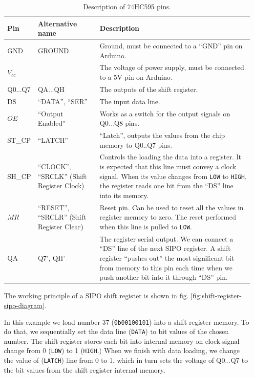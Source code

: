 \documentclass[../sparc.tex]{subfiles}
\begin{document}
\begin{table}[H]
  \centering
  \begin{tabular}{ | m{1.5cm} | m{2.5cm} | m{6.0cm} | }
    \hline
    \textbf{Pin}
    & \textbf{Alternative name}
    & \textbf{Description} \\
    \hline
    GND
    & GROUND
    & Ground, must be connected to a ``GND'' pin on Arduino. \\
    \hline
    $V_{cc}$
    &
    & The voltage of power supply, must be connected to a 5V pin
    on Arduino. \\
    \hline
    Q0...Q7
    & QA...QH
    & The outputs of the shift register. \\
    \hline
    DS
    & ``DATA'', ``SER''
    & The input data line. \\
    \hline
    $\overline{OE}$
    & ``Output Enabled''
    & Works as a switch for the output signals on
    Q0...Q8 pins. \\
    \hline
    ST\_CP
    & ``LATCH''
    & ``Latch'', outputs the values from the chip memory
    to Q0..Q7 pins. \\
    \hline
    SH\_CP
    & ``CLOCK'', ``SRCLK'' (Shift Register Clock)
    & Controls the loading the data into a register.  It is expected that
    this line must convey a clock signal.  When its value changes from
    \texttt{LOW} to \texttt{HIGH}, the register reads one bit from the ``DS''
    line into its memory. \\
    \hline
    $\overline{MR}$
    & ``RESET'', ``SRCLR'' (Shift Register Clear)
    & Reset pin.  Can be used to reset all the values in register memory
    to zero.  The reset performed when this line is pulled to \texttt{LOW}. \\
    \hline
    QA
    & Q7', QH'
    & The register serial output.  We can connect a ``DS'' line of the next
    SIPO register.  A shift register ``pushes out'' the most significant bit
    from memory to this pin each time when we push another bit into it through
    ``DS'' pin. \\
    \hline
  \end{tabular}
  \caption{Description of 74HC595 pins.}
  \label{table:shift-register-sipo-pins}
\end{table}

The working principle of a SIPO shift register is shown in fig.
\ref{fig:shift-register-sipo-diagram}.


In this example we load number 37 (\texttt{0b00100101}) into a shift
register memory.  To do that, we sequentially set the data line (\texttt{DATA})
to bit values of the chosen number.  The shift register stores each bit into
internal memory on clock signal change from 0 (\texttt{LOW}) to 1
(\texttt{HIGH}.)  When we finish with data loading, we change the value of
(\texttt{LATCH}) line from 0 to 1, which in turn sets the voltage of Q0...Q7 to
the bit values from the shift register internal memory.
\end{document}
